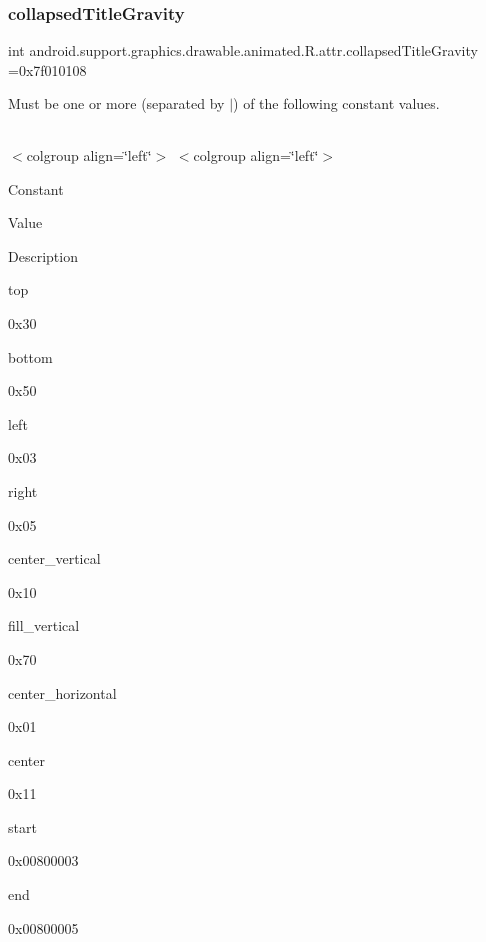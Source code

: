 \subsubsection{\texorpdfstring{collapsed\+Title\+Gravity}{collapsedTitleGravity}}
{\footnotesize\ttfamily int android.\+support.\+graphics.\+drawable.\+animated.\+R.\+attr.\+collapsed\+Title\+Gravity =0x7f010108\hspace{0.3cm}{\ttfamily [static]}}

Must be one or more (separated by \textquotesingle{}$\vert$\textquotesingle{}) of the following constant values.

\tabulinesep=1mm
\begin{longtabu} spread 0pt [c]{*{0}{|X[-1]}|}
\hline
\end{longtabu}
$<$colgroup align=\char`\"{}left\char`\"{}$>$ $<$colgroup align=\char`\"{}left\char`\"{}$>$ 

Constant

Value

Description 

{\ttfamily top}

0x30

{\ttfamily bottom}

0x50

{\ttfamily left}

0x03

{\ttfamily right}

0x05

{\ttfamily center\+\_\+vertical}

0x10

{\ttfamily fill\+\_\+vertical}

0x70

{\ttfamily center\+\_\+horizontal}

0x01

{\ttfamily center}

0x11

{\ttfamily start}

0x00800003

{\ttfamily end}

0x00800005\mbox{\label{classandroid_1_1support_1_1graphics_1_1drawable_1_1animated_1_1R_1_1attr_a50a6c0d4ffb0e64609b354725f1a8fe3}} 
